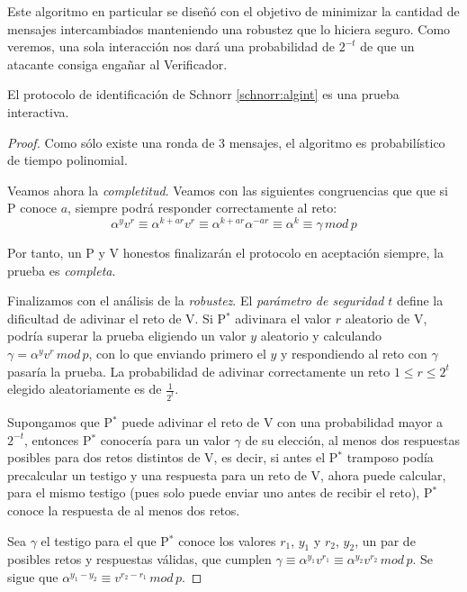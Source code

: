 \hfil

Este algoritmo en particular se diseñó con el objetivo de minimizar la cantidad de mensajes intercambiados manteniendo una robustez que lo hiciera seguro. Como veremos, una sola interacción nos dará una probabilidad de $2^{-t}$ de que un atacante consiga engañar al Verificador.


\begin{theorem}
	El protocolo de identificación de Schnorr \ref{schnorr:algint} es una prueba interactiva.
\end{theorem}

\begin{proof}
	Como sólo existe una ronda de 3 mensajes, el algoritmo es probabilístico de tiempo polinomial.
	
	
	Veamos ahora la \textit{completitud}. Veamos con las siguientes congruencias que que si P conoce $a$, siempre podrá responder correctamente al reto:
	\[
	\alpha^y v^r \equiv \alpha ^{k+ar} v^r \equiv \alpha^{k+ar} \alpha ^{-a r} \equiv \alpha ^k \equiv \gamma \, mod \, p
	\]
	
	Por tanto, un P y V honestos finalizarán el protocolo en aceptación siempre, la prueba es \textit{completa}.
	
	Finalizamos con el análisis de la \textit{robustez}. El \textit{parámetro de seguridad} $t$ define la dificultad de adivinar el reto de V. Si P$^*$ adivinara el valor $r$ aleatorio de V, podría superar la prueba eligiendo un valor $y$ aleatorio y calculando $\gamma = \alpha ^y v ^r \, mod \, p$, con lo que enviando primero el $y$ y respondiendo al reto con $\gamma$ pasaría la prueba. La probabilidad de adivinar correctamente un reto $1\leq r\leq 2^t$ elegido aleatoriamente es de $\frac{1}{2^t}$.
	
	
	Supongamos que P$^*$ puede adivinar el reto de V con una probabilidad mayor a $2^{-t}$, entonces P$^*$ conocería para un valor $\gamma$ de su elección, al menos dos respuestas posibles para dos retos distintos de V, es decir, si antes el P$^*$ tramposo podía precalcular un testigo y una respuesta para un reto de V, ahora puede calcular, para el mismo testigo (pues solo puede enviar uno antes de recibir el reto), P$^*$ conoce la respuesta de al menos dos retos.
	
	Sea $\gamma$ el testigo para el que P$^*$ conoce los valores $r_1$, $y_1$ y $r_2$, $y_2$, un par de posibles retos y respuestas válidas, que cumplen $\gamma \equiv \alpha^{y_1} v^{r_1} \equiv \alpha^{y_2} v^{r_2} \, mod \, p$. Se sigue que $\alpha^{y_1 - y_2} \equiv v ^{r_2 - r_1}  \, mod \, p$.
		

\end{proof}
